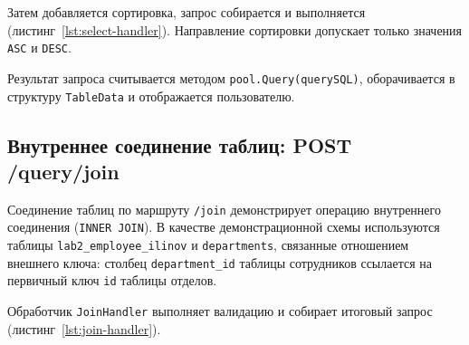 Затем добавляется сортировка, запрос собирается и выполняется (листинг~\ref{lst:select-handler}). Направление сортировки допускает только значения \texttt{ASC} и \texttt{DESC}.

\begin{listing}[H]
    \caption{Сортировка, сборка и выполнение запроса \texttt{SELECT} в \texttt{handlers\_query.go}}
    \label{lst:select-handler}
\end{listing}

Результат запроса считывается методом \texttt{pool.Query(querySQL)}, оборачивается в структуру \texttt{TableData} и отображается пользователю.

\subsection{Внутреннее соединение таблиц: POST /query/join}

Соединение таблиц по маршруту \texttt{/join} демонстрирует операцию внутреннего соединения (\texttt{INNER JOIN}). В качестве демонстрационной схемы используются таблицы \texttt{lab2\_employee\_ilinov} и \texttt{departments}, связанные отношением внешнего ключа: столбец \texttt{department\_id} таблицы сотрудников ссылается на первичный ключ \texttt{id} таблицы отделов.

Обработчик \texttt{JoinHandler} выполняет валидацию и собирает итоговый запрос (листинг~\ref{lst:join-handler}).

\begin{listing}[H]
    \caption{Сборка и исполнение команды \texttt{INNER JOIN} в \texttt{handlers\_query.go}}
    \label{lst:join-handler}
\end{listing}